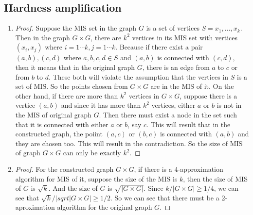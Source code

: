 \documentclass{article}
\begin{document}
\begin{enumerate}
	\section{Hardness amplification}
		\begin{enumerate}
			\item \begin{proof}
				Suppose the MIS set in the graph $G$ is a set of vertices $S = {x_1, ..., x_k}$. Then in the graph $G \times G$, there are $k^2$ vertices in its MIS set with vertices $(x_i, x_j)$ where $i = 1\cdots k, j = 1\cdots k$. Because if there exist a pair $(a, b), (c, d)$ where $a, b, c, d \in S$ and $(a, b)$ is connected with $(c,d)$, then it means that in the original graph $G$, there is an edge from $a$ to $c$ or from $b$ to $d$. These both will violate the assumption that the vertices in $S$ is a set of MIS. So the points chosen from $G \times G$ are in the MIS of it. On the other hand, if there are more than $k^2$ vertices in $G \times G$, suppose there is a vertice $(a, b)$ and since it has more than $k^2$ vertices, either $a$ or $b$ is not in the MIS of original graph $G$. Then there must exist a node in the set such that it is connected with either $a$ or $b$, say $c$. This will result that in the constructed graph, the poiint $(a, c)$ or $(b, c)$ is connected with $(a, b)$ and they are chosen too. This will result in the contradiction. So the size of MIS of graph $G \times G$ can only be exactly $k^2$. \end{proof}
			\item \begin{proof} For the constructed graph $G \times G$, if there is a 4-approximation algorithm for MIS of it, suppose the size of the MIS is $k$, then the size of MIS of $G$ is $\sqrt{k}$. And the size of $G$ is $\sqrt{|G \times G|}$. Since $k / |G \times G| \geq 1/4 $, we can see that $\sqrt{k} / |sqrt{|G \times G|} \geq 1/2$. So we can see that there must be a 2-aproximation algorithm for the original graph $G$. \end{proof}
		\end{enumerate}


\end{enumerate}
\end{document}
